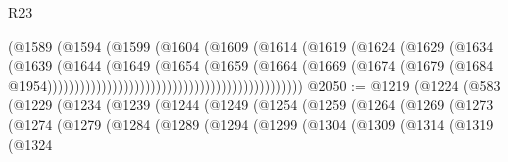 \begin{lexlean}{R23}
\begin{coremodule}
                                                          (@1589
                                                            (@1594
                                                              (@1599
                                                                (@1604
                                                                  (@1609
                                                                    (@1614
                                                                      (@1619
                                                                        (@1624
                                                                          (@1629
                                                                            (@1634
                                                                              (@1639
                                                                                (@1644
                                                                                  (@1649
                                                                                    (@1654
                                                                                      (@1659
                                                                                        (@1664
                                                                                          (@1669
                                                                                            (@1674
                                                                                              (@1679
                                                                                                (@1684
                                                                                                  @1954)))))))))))))))))))))))))))))))))))))))))))))))
@2050 := @1219
    (@1224
      (@583
        (@1229
          (@1234
            (@1239
              (@1244
                (@1249
                  (@1254
                    (@1259
                      (@1264
                        (@1269
                          (@1273
                            (@1274
                              (@1279
                                (@1284
                                  (@1289
                                    (@1294
                                      (@1299
                                        (@1304
                                          (@1309
                                            (@1314
                                              (@1319
                                                (@1324

\end{coremodule}
\end{lexlean}
